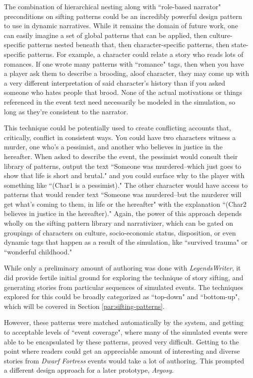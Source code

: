 The combination of hierarchical nesting along with ``role-based narrator" preconditions on sifting patterns could be an incredibly powerful design pattern to use in dynamic narratives. While it remains the domain of future work, one can easily imagine a set of global patterns that can be applied, then culture-specific patterns nested beneath that, then character-specific patterns, then state-specific patterns. For example, a character could relate a story who reads lots of romances. If one wrote many patterns with ``romance" tags, then when you have a player ask them to describe a brooding, aloof character, they may come up with a very different interpretation of said character’s history than if you asked someone who hates people that brood. None of the actual motivations or things referenced in the event text need necessarily be modeled in the simulation, so long as they’re consistent to the narrator.

This technique could be potentially used to create conflicting accounts that, critically, conflict in consistent ways. You could have two characters witness a murder, one who’s a pessimist, and another who believes in justice in the hereafter. When asked to describe the event, the pessimist would consult their library of patterns, output the text ``Someone was murdered–which just goes to show that life is short and brutal." and you could surface why to the player with something like ``(Char1 is a pessimist)." The other character would have access to patterns that would render text ``Someone was murdered–but the murderer will get what’s coming to them, in life or the hereafter" with the explanation ``(Char2 believes in justice in the hereafter)." Again, the power of this approach depends wholly on the sifting pattern library and narrativizer, which can be gated on groupings of characters on culture, socio-economic status, disposition, or even dynamic tags that happen as a result of the simulation, like ``survived trauma" or ``wonderful childhood." 

While only a preliminary amount of authoring was done with \textit{LegendsWriter}, it did provide fertile initial ground for exploring the technique of story sifting, and generating stories from particular sequences of simulated events. The techniques explored for this could be broadly categorized as ``top-down" and ``bottom-up", which will be covered in Section \ref{par:sifting-patterns}.

However, these patterns were matched automatically by the system, and getting to acceptable levels of ``event coverage", where many of the simulated events were able to be encapsulated by these patterns, proved very difficult. Getting to the point where readers could get an appreciable amount of interesting and diverse stories from \textit{Dwarf Fortress} events would take a lot of authoring. This prompted a different design approach for a later prototype, \textit{Argosy}.

